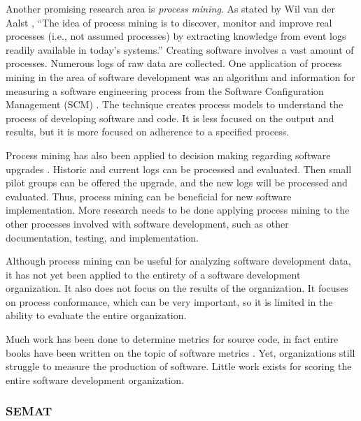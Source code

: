 \documentclass[SDSUThesis.tex]{subfiles}
\begin{document}
    Another promising research area is \textit{process mining}.
    As stated by Wil van der Aalst \cite{vanderAalst2011}, 
    ``The idea of process mining is to discover, monitor
    and improve real
    processes (i.e., not assumed processes) by extracting knowledge from event logs
    readily available in today's systems.''  Creating software involves
    a vast amount of processes.  Numerous logs of raw data are collected.  
    One application of process mining in the area of software development
    was an algorithm and information for measuring a software engineering process from
    the Software Configuration Management (SCM) \cite{Rubin2007}.
    The technique creates process models 
    to understand the process of developing software and code. 
    It is less focused on the output and results,
    but it is more focused on adherence to a specified process.
    
    Process mining has also been applied to decision making regarding software 
    upgrades \cite{Genuchten2014}.  Historic and current logs can be 
    processed and evaluated.
    Then small pilot groups can be offered the upgrade, and the new logs will 
    be processed and evaluated. Thus, process mining can be beneficial for new 
    software implementation.  More research needs to be done applying
    process mining to the other processes involved with software development,
    such as other documentation, testing, and implementation. 
    
    Although process mining can be useful for analyzing software
    development data, it has not yet been applied to the entirety 
    of a software development organization. It also does not
    focus on the results of the organization.  It focuses
    on process conformance, which can be very important, so it
    is limited in the ability to evaluate the entire organization. 

    Much work has been done to determine metrics for source code, in fact 
    entire books have been written on the topic of software 
    metrics \cite{Jones1996, Putnam2013}. Yet, 
    organizations still struggle to measure the production of software.
    Little work exists
    for scoring the entire software development organization. 

\subsubsection{SEMAT}
\end{document}
